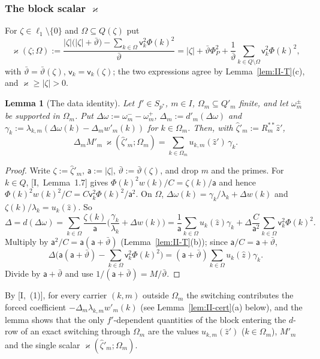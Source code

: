 \documentclass[10pt]{amsart}
\newtheorem{lemma}[theorem]{Lemma}
\theoremstyle{definition}
\theoremstyle{remark}
\newcommand{\zh}{\hat z}
\begin{document}
\subsubsection*{The block scalar $\varkappa$}
For $\zeta\in\ell_1\setminus\{0\}$ and $\Omega\subseteq Q(\zeta)$ put
\[
 \varkappa(\zeta;\Omega):=\frac{|\zeta|\big(|\zeta|+\bar\vartheta\big)-
 \sum_{k\in\Omega}\mathsf v_k^2\Phi(k)^2}{\bar\vartheta}
 =|\zeta|+\bar\vartheta\Phi_P^2+\frac1{\bar\vartheta}\sum_{k\in Q\setminus\Omega}
 \mathsf v_k^2\Phi(k)^2 ,
\]
with $\bar\vartheta=\bar\vartheta(\zeta)$, $\mathsf v_k=\mathsf v_k(\zeta)$; the
two expressions agree by Lemma~\ref{lem:II-T}(c), and $\varkappa\ge|\zeta|>0$.

\begin{lemma}[The data identity]\label{lem:II-kappa}
Let $f'\in S_{p^*}$, $m\in I$, $\Omega_m\subseteq Q'_m$ finite, and let
$\omega^\pm_m$ be supported in $\Omega_m$.  Put $\Delta\omega:=\omega^-_m-
\omega^+_m$, $\Delta_m:=d'_m(\Delta\omega)$ and $\gamma_k:=\lambda_{k,m}
(\Delta\omega(k)-\Delta_mw'_m(k))$ for $k\in\Omega_m$.  Then, with
$\hat\zeta'_m:=R_m^{**}\zh'$,
\[
 \Delta_mM'_m\,\varkappa(\hat\zeta'_m;\Omega_m)=\sum_{k\in\Omega_m}
 u_{k,m}(\zh')\,\gamma_k .
\]
\end{lemma}

\begin{proof}
Write $\zeta:=\hat\zeta'_m$, $\mathsf a:=|\zeta|$, $\bar\vartheta:=
\bar\vartheta(\zeta)$, and drop $m$ and the primes.  For $k\in Q$,
[I,~Lemma~1.7] gives $\Phi(k)^2w(k)/C=\zeta(k)/\mathsf a$ and hence
$\Phi(k)^2w(k)^2/C=C\mathsf v_k^2\Phi(k)^2/\mathsf a^2$.  On $\Omega$,
$\Delta\omega(k)=\gamma_k/\lambda_k+\Delta w(k)$ and
$\zeta(k)/\lambda_k=u_k(\zh)$.  So
\[
 \Delta=d(\Delta\omega)=\sum_{k\in\Omega}\frac{\zeta(k)}{\mathsf a}
 \Big(\frac{\gamma_k}{\lambda_k}+\Delta w(k)\Big)=\frac1{\mathsf a}
 \sum_{k\in\Omega}u_k(\zh)\gamma_k+\Delta\frac C{\mathsf a^2}\sum_{k\in\Omega}
 \mathsf v_k^2\Phi(k)^2 .
\]
Multiply by $\mathsf a^2/C=\mathsf a(\mathsf a+\bar\vartheta)$
(Lemma~\ref{lem:II-T}(b)); since $\mathsf a/C=\mathsf a+\bar\vartheta$,
\[
 \Delta\Big(\mathsf a(\mathsf a+\bar\vartheta)-\sum_{k\in\Omega}\mathsf v_k^2
 \Phi(k)^2\Big)=(\mathsf a+\bar\vartheta)\sum_{k\in\Omega}u_k(\zh)\gamma_k .
\]
Divide by $\mathsf a+\bar\vartheta$ and use $1/(\mathsf a+\bar\vartheta)=
M/\bar\vartheta$.
\end{proof}

By [I,~(1)], for every carrier $(k,m)$ outside $\Omega_m$ the switching
contributes the forced coefficient $-\Delta_m\lambda_{k,m}w'_m(k)$ (see
Lemma~\ref{lem:II-cert}(a) below), and the lemma shows that the only
$f'$-dependent quantities of the block entering the $d$-row of an exact
switching through $\Omega_m$ are the values $u_{k,m}(\zh')$ ($k\in\Omega_m$),
$M'_m$ and the single scalar $\varkappa(\hat\zeta'_m;\Omega_m)$.
\end{document}
